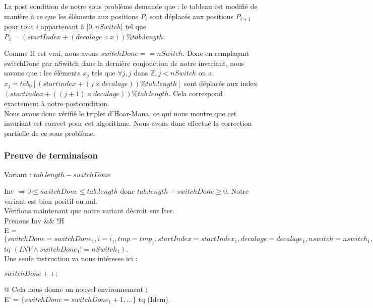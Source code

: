 La post condition de notre sous problème demande que : le tableau est modifié de manière à ce que les éléments aux positions $P_{i}$ sont déplacés aux positions $P_{i+1}$ pour tout $i$ appartenant à $[0,nSwitch[$ tel que $P_{x} = (startIndex + (decalage\times x)) \% tab.length$.

Comme H est vrai, nous avons $switchDone == nSwitch$. Donc en remplaçant switchDone par nSwitch dans la dernière conjonction de notre invariant, nous savons que : les éléments $x_{j}$ tels que $\forall j, j$ dans $\mathbb{Z}, j<nSwitch$ on a $x_{j}=tab_{0}[(startindex + (j\times decalage)) \% tab.length]$ sont déplacés aux index $(startindex + ((j+1)\times decalage)) \% tab.length.$ 
Cela correspond exactement à notre postcondition.\\

Nous avons donc vérifié le triplet d'Hoar-Mana, ce qui nous montre que cet invariant est correct pour cet algorithme. 
Nous avons donc effectué la correction partielle de ce sous problème. 


\subsubsection*{Preuve de terminaison}
Variant  : $tab.length - switchDone$

Inv $\Rightarrow 0 \leq switchDone \leq tab.length$ donc $tab.length - switchDone \geq 0$. Notre variant est bien positif ou nul.\\ 

Vérifions maintenant que notre variant décroit sur Iter.\\

Prenons Inv $\&\&$ !H \\

E = $\{ switchDone = switchDone_{1}, i = i_{1}, tmp = tmp_{1}, startIndex = startIndex_{1}, decalage = decalage_{1}, nswitch = nswitch_{1}, tab = tab_{1}\}$\\
tq $(INV \wedge switchDone_{1} != nSwitch_{1})$.\\

Une seule instruction va nous intéresse ici : \\

\begin{center}
  $switchDone++;$\\
 \end{center} 
 @
Cela nous donne un nouvel environnement :\\

E' = $\{switchDone = switchDone_{1}+1, ...\}$ tq (Idem).\\

